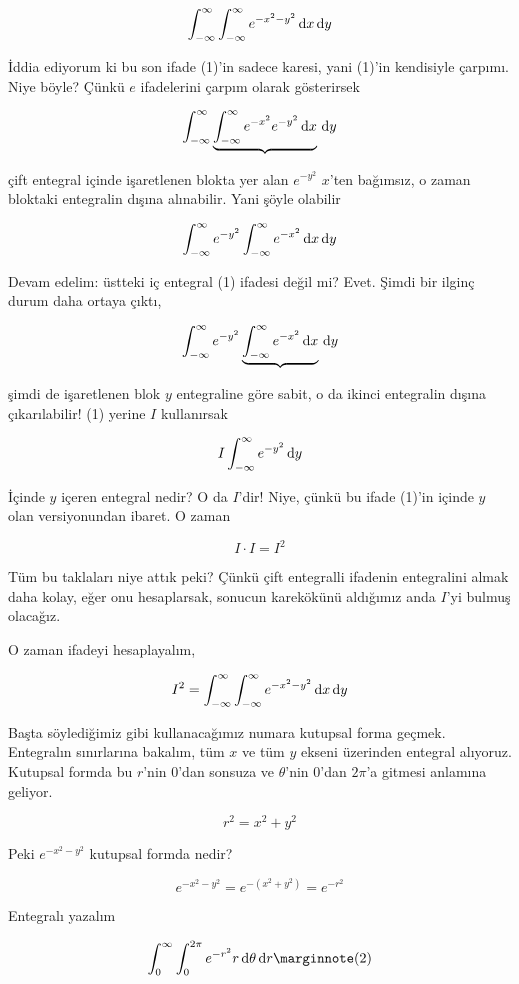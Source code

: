 \documentclass[12pt,fleqn]{article}\usepackage{../../common}
\begin{document}
$$ \int_{-\infty}^{\infty} \int_{-\infty}^{\infty} e^{-x^2-y^2} \,\mathrm{d} x \,\mathrm{d} y $$

İddia ediyorum ki bu son ifade (1)'in sadece karesi, yani (1)'in kendisiyle
çarpımı. Niye böyle? Çünkü $e$ ifadelerini çarpım olarak gösterirsek

$$
\int_{-\infty}^{\infty} \underbrace{\int_{-\infty}^{\infty} e^{-x^2} e^{-y^2} 
\,\mathrm{d} x} \,\mathrm{d} y
$$

çift entegral içinde işaretlenen blokta yer alan $e^{-y^2}$ $x$'ten
bağımsız, o zaman bloktaki entegralin dışına alınabilir. Yani şöyle olabilir

$$
\int_{-\infty}^{\infty} e^{-y^2} \int_{-\infty}^{\infty} e^{-x^2} \,\mathrm{d} x \,\mathrm{d} y
$$

Devam edelim: üstteki iç entegral (1) ifadesi değil mi? Evet. Şimdi bir
ilginç durum daha ortaya çıktı, 

$$
\int_{-\infty}^{\infty}  e^{-y^2} 
\underbrace{\int_{-\infty}^{\infty} e^{-x^2} \,\mathrm{d} x} \,\mathrm{d} y
$$

şimdi de işaretlenen blok $y$ entegraline göre sabit, o da ikinci entegralin
dışına çıkarılabilir! (1) yerine $I$ kullanırsak

$$ I \int_{-\infty}^{\infty}  e^{-y^2} \,\mathrm{d} y $$

İçinde $y$ içeren entegral nedir? O da $I$'dir! Niye, çünkü bu ifade 
(1)'in içinde $y$ olan versiyonundan ibaret. O zaman 

$$ I \cdot I = I^2 $$

Tüm bu taklaları niye attık peki? Çünkü çift entegralli ifadenin entegralini
almak daha kolay, eğer onu hesaplarsak, sonucun karekökünü aldığımız anda $I$'yi
bulmuş olacağız.

O zaman ifadeyi hesaplayalım, 

$$
I^2 = \int_{-\infty}^{\infty} \int_{-\infty}^{\infty} e^{-x^2-y^2} \,\mathrm{d} x \,\mathrm{d} y
$$

Başta söylediğimiz gibi kullanacağımız numara kutupsal forma geçmek. Entegralın
sınırlarına bakalım, tüm $x$ ve tüm $y$ ekseni üzerinden entegral
alıyoruz. Kutupsal formda bu $r$'nin 0'dan sonsuza ve $\theta$'nin 0'dan
$2\pi$'a gitmesi anlamına geliyor.

$$ r^2 = x^2 + y^2 $$

Peki $e^{-x^2-y^2}$ kutupsal formda nedir? 

$$ e^{-x^2-y^2} = e^{-(x^2+y^2)} = e^{-r^2} $$

Entegralı yazalım

$$
\int_{0}^{\infty} \int_{0}^{2\pi} e^{-r^2} r \ud \theta \ud r 
\mlabel{2}
$$
\end{document}
